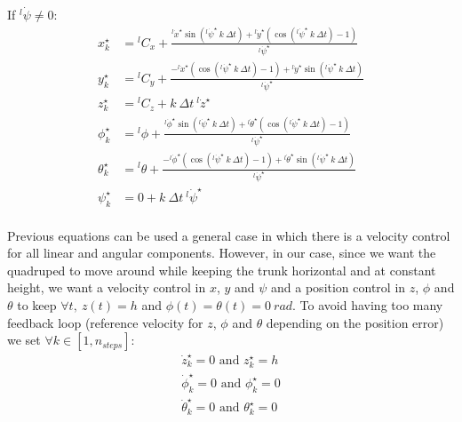 \documentclass[a4paper,11pt]{article}
\begin{document}
If ${}^l\!\dot \psi \neq 0$:
\begin{align}
x_k^\star &= {}^l\! C_x + \frac{{}^l\!\dot x^\star \sin({}^l\!\dot \psi^\star ~ k ~ \Delta t) + {}^l\!\dot y^\star \left( \cos({}^l\!\dot \psi^\star ~ k ~ \Delta t) - 1 \right)}{{}^l\!\dot \psi^\star} \\
y_k^\star &= {}^l\! C_y + \frac{- {}^l\!\dot x^\star \left( \cos({}^l\!\dot \psi^\star ~ k ~ \Delta t) - 1 \right) + {}^l\!\dot y^\star \sin({}^l\!\dot \psi^\star ~ k ~ \Delta t)}{{}^l\!\dot \psi^\star} \\
z_k^\star &= {}^l\! C_z + k ~ \Delta t ~  {}^l\! \dot z^\star \\
\phi_k^\star &= {}^l\! \phi + \frac{{}^l\!\dot \phi^\star \sin({}^l\!\dot \psi^\star ~ k ~ \Delta t) + {}^l\!\dot \theta^\star \left( \cos({}^l\!\dot \psi^\star ~ k ~ \Delta t) - 1 \right)}{{}^l\!\dot \psi^\star} \\
\theta_k^\star &= {}^l\! \theta + \frac{- {}^l\!\dot \phi^\star \left( \cos({}^l\!\dot \psi^\star ~ k ~ \Delta t) - 1 \right) + {}^l\!\dot \theta^\star \sin({}^l\!\dot \psi^\star ~ k ~ \Delta t)}{{}^l\!\dot \psi^\star} \\
\psi_k^\star &= 0 + k ~ \Delta t ~  {}^l\! \dot \psi^\star \\
\end{align}


Previous equations can be used a general case in which there is a velocity control for all linear and angular components. However, in our case, since we want the quadruped to move around while keeping the trunk horizontal and at constant height, we want a velocity control in $x$, $y$ and $\psi$ and a position control in $z$, $\phi$ and $\theta$ to keep $\forall t, ~z(t) = h$ and $\phi(t) = \theta(t) = 0~rad$. To avoid having too many feedback loop (reference velocity for $z$, $\phi$ and $\theta$ depending on the position error) we set $\forall k \in [1, n_{steps}]$:
\begin{align}
\dot z_k^\star = 0 \text{ and } z_k^\star = h \\
\dot \phi_k^\star = 0 \text{ and }  \phi_k^\star = 0 \\
\dot \theta_k^\star = 0 \text{ and }  \theta_k^\star = 0
\end{align}
\end{document}
